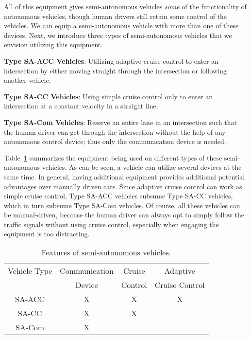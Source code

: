 All of this equipment gives semi-autonomous vehicles \emph{some} of
the functionality of autonomous vehicles, though human drivers still
retain some control of the vehicles.  We can equip a semi-autonomous
vehicle with more than one of these devices.  Next, we introduce three
types of semi-autonomous vehicles that we envision utilizing this
equipment.

\begin{small_ind_s_itemize}
\item \textbf{Type SA-ACC Vehicles}: Utilizing adaptive cruise
control to enter an intersection by either moving straight through the
intersection or following another vehicle.
\item \textbf{Type SA-CC Vehicles}: Using simple cruise control only
to enter an intersection at a constant velocity in a straight line.
\item \textbf{Type SA-Com Vehicles}: Reserve an entire lane in an
intersection such that the human driver can get through the
intersection without the help of any autonomous control device; thus
only the communication device is needed.
\end{small_ind_s_itemize}

Table~\ref{table:type} summarizes the equipment being used on
different types of these semi-autonomous vehicles.  As can be seen, a
vehicle can utilize several devices at the same time.  In general,
having additional equipment provides additional potential advantages
over manually driven cars.  Since adaptive cruise control can work as
simple cruise control, Type SA-ACC vehicles subsume Type SA-CC
vehicles, which in turn subsume Type SA-Com vehicles.  Of course, all
these vehicles can be manual-driven, because the human driver can
always opt to simply follow the traffic signals without using cruise
control, especially when engaging the equipment is too distracting.


\begin{table}
\centering
\caption{Features of semi-autonomous vehicles.}
\label{table:type}
\small
\begin{tabular}{|c|c|c|c|}
  \hline
  Vehicle Type & Communication & Cruise & Adaptive \\
               & Device & Control & Cruise Control \\
  \hline
  SA-ACC & X & X & X  \\
  \hline
  SA-CC & X & X &  \\
  \hline
  SA-Com & X & &  \\
  \hline
\end{tabular}
\end{table}

